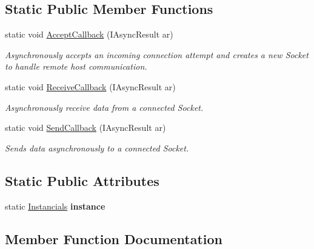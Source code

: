 \subsection*{Static Public Member Functions}
\begin{DoxyCompactItemize}
\item 
static void \hyperlink{class_lerp2_console_1_1_program_a25f594d0fd6628c66c0378f0d564b7e9}{Accept\+Callback} (I\+Async\+Result ar)
\begin{DoxyCompactList}\small\item\em Asynchronously accepts an incoming connection attempt and creates a new Socket to handle remote host communication. \end{DoxyCompactList}\item 
static void \hyperlink{class_lerp2_console_1_1_program_a2b495a0ca81fe3e74a1978acceddf73c}{Receive\+Callback} (I\+Async\+Result ar)
\begin{DoxyCompactList}\small\item\em Asynchronously receive data from a connected Socket. \end{DoxyCompactList}\item 
static void \hyperlink{class_lerp2_console_1_1_program_a9e872ccff3eae10393e4dc55c62ba04e}{Send\+Callback} (I\+Async\+Result ar)
\begin{DoxyCompactList}\small\item\em Sends data asynchronously to a connected Socket. \end{DoxyCompactList}\end{DoxyCompactItemize}
\subsection*{Static Public Attributes}
\begin{DoxyCompactItemize}
\item 
\mbox{\label{class_lerp2_console_1_1_program_a365de24d5716a18897945ed083e6afae}} 
static \hyperlink{class_lerp2_console_1_1_instancials}{Instancials} {\bfseries instance}
\end{DoxyCompactItemize}


\subsection{Member Function Documentation}
\mbox{\label{class_lerp2_console_1_1_program_a25f594d0fd6628c66c0378f0d564b7e9}} 
